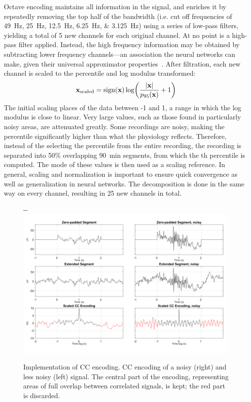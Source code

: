Octave encoding maintains all information in the signal, and enriches it by repeatedly removing the top half of the bandwidth (i.e. cut off frequencies of \SIlist{49;25;12.5;6.25;3.125}{\hertz}) using a series of low-pass filters, yielding a total of 5 new channels for each original channel. 
At no point is a high-pass filter applied. 
Instead, the high frequency information may be obtained by subtracting lower frequency channels---an association the neural networks can make, given their universal approximator properties~\cite{Hornik1989}. 
After filtration, each new channel is scaled to the  percentile and log modulus transformed:
\begin{equation}
    \mathbf{x}_{\mathrm{scaled}} = \sign \parentheses*{ \mathbf{x} } \log \parentheses*{\frac{|\mathbf{x}|}{p_{95}(\mathbf{x})} + 1 }
\end{equation}
The initial scaling places  of the data between -1 and 1, a range in which the log modulus is close to linear. 
Very large values, such as those found in particularly noisy areas, are attenuated greatly. 
Some recordings are noisy, making the  percentile significantly higher than what the physiology reflects. 
Therefore, instead of the selecting the  percentile from the entire recording, the recording is separated into 50\% overlapping \SI{90}{\minute} segments, from which the th percentile is computed. 
The mode of these values is then used as a scaling reference. 
In general, scaling and normalization is important to ensure quick convergence as well as generalization in neural networks. 
The decomposition is done in the same way on every channel, resulting in 25 new channels in total.

\begin{figure}
\begin{adjustwidth*}{}{-\marginparwidth-\marginparsep}
    \centering
    \includegraphics[width=\linewidth]{figures/paper-iii/SuppFigure_5.png}
    \caption[\acs{CC} encoding example]{Implementation of \acs{CC} encoding. \ac{CC} encoding of a noisy (right) and less noisy (left) signal. The central part of the encoding, representing areas of full overlap between correlated signals, is kept; the red part is discarded.}
    \label{fig:sleep-stages:paper-iii:figure-s05}
\end{adjustwidth*}
\end{figure}

